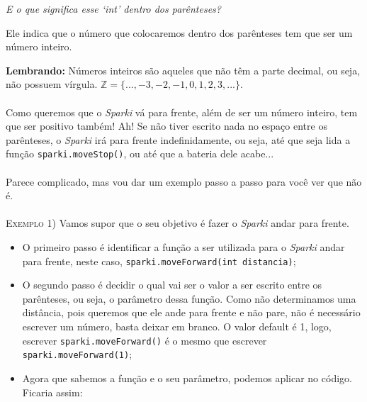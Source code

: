     \textit{E o que significa esse `int' dentro dos parênteses?} \par
    Ele indica que o número que colocaremos dentro dos parênteses tem que ser um número inteiro.
    
    \begin{center}
    \textcolor{mydarkblue!80!black}{\textbf{Lembrando:}} Números inteiros são aqueles que não têm a parte decimal, ou seja, não possuem vírgula. $\mathbb{Z}=\{..., -3, -2, -1, 0, 1, 2, 3, ...\}$.
    \end{center}
    
    \paragraph{}
    Como queremos que o \textsl{Sparki} vá para frente, além de ser um número inteiro, tem que ser positivo também! Ah! Se não tiver escrito nada no espaço entre os parênteses, o \textsl{Sparki} irá para frente indefinidamente, ou seja, até que seja lida a função \lstinline[columns=fixed]{sparki.moveStop()}, ou até que a bateria dele acabe...
    \paragraph{}
    Parece complicado, mas vou dar um exemplo passo a passo para você ver que não é.
    \\~\\
    \textsc{Exemplo 1)} Vamos supor que o seu objetivo é fazer o \textsl{Sparki} andar para frente.
    
    \begin{itemize}
        \item O primeiro passo é identificar a função a ser utilizada para o \textsl{Sparki} andar para frente, neste caso, \lstinline[columns=fixed]{sparki.moveForward(int distancia)};
        \item O segundo passo é decidir o qual vai ser o valor a ser escrito entre os parênteses, ou seja, o parâmetro dessa função. Como não determinamos uma distância, pois queremos que ele ande para frente e não pare, não é necessário escrever um número, basta deixar em branco. O valor default é 1, logo, escrever \lstinline[columns=fixed]{sparki.moveForward()} é o mesmo que escrever \lstinline[columns=fixed]{sparki.moveForward(1)};
        \item Agora que sabemos a função e o seu parâmetro, podemos aplicar no código. Ficaria assim:
    \end{itemize}
    
